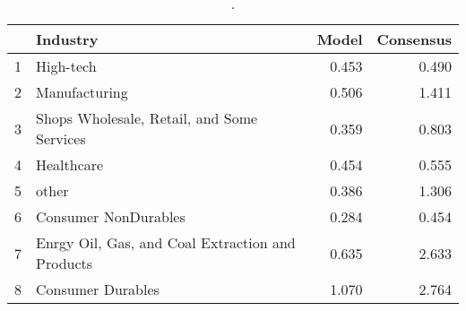 \begin{table}[ht]
\centering
\begin{tabular}{rlrr}
  \hline
 & Industry & Model & Consensus \\ 
  \hline
1 & High-tech & 0.453 & 0.490 \\ 
  2 & Manufacturing & 0.506 & 1.411 \\ 
  3 & Shops Wholesale, Retail, and Some Services & 0.359 & 0.803 \\ 
  4 & Healthcare & 0.454 & 0.555 \\ 
  5 & other & 0.386 & 1.306 \\ 
  6 & Consumer NonDurables & 0.284 & 0.454 \\ 
  7 & Enrgy Oil, Gas, and Coal Extraction and Products & 0.635 & 2.633 \\ 
  8 & Consumer Durables & 1.070 & 2.764 \\ 
   \hline
\end{tabular}
\caption{.} 
\label{spe-by-industry-table-fy3}
\end{table}
